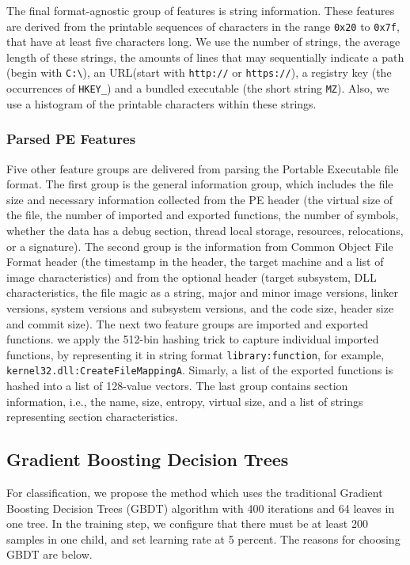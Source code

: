 \documentclass[runningheads]{llncs}
\begin{document}
The final format-agnostic group of features is string information. These features are derived from the printable sequences of characters in the range \verb|0x20| to \verb|0x7f|, that have at least five characters long. We use the number of strings, the average length of these strings, the amounts of lines  that may sequentially indicate a path (begin with \verb|C:\|), an URL(start with \verb|http://| or \verb|https://|), a registry key (the occurrences of \verb|HKEY_|) and a bundled executable (the short string \verb|MZ|). Also, we use a histogram of the printable characters within these strings.

\subsubsection{Parsed PE Features}

Five other feature groups are delivered from parsing the Portable Executable file format. The first group is the general information group, which includes the file size and necessary information collected from the PE header (the virtual size of the file, the number of imported and exported functions, the number of symbols, whether the data has a debug section, thread local storage, resources, relocations, or a signature). The second group is the information from Common Object File Format header (the timestamp in the header, the target machine and a list of image characteristics) and from the optional header (target subsystem, DLL  characteristics,  the file magic as a string, major and minor image versions, linker versions, system versions and subsystem versions, and the code size, header size and commit size). The next two feature groups are imported and exported functions. we apply the 512-bin hashing trick to capture individual imported functions, by representing it in string format \verb|library:function|, for example, \verb|kernel32.dll:CreateFileMappingA|. Simarly, a list of the exported functions is hashed into a list of 128-value vectors. The last group contains section information, i.e., the name, size, entropy, virtual size, and a list of strings representing section characteristics.

\subsection{Gradient Boosting Decision Trees}

For classification, we propose the method which uses the traditional Gradient Boosting Decision Trees (GBDT) algorithm with 400 iterations and 64 leaves in one tree. In the training step, we configure that there must be at least 200 samples in one child, and set learning rate at 5 percent. The reasons for choosing GBDT are below.
\end{document}
